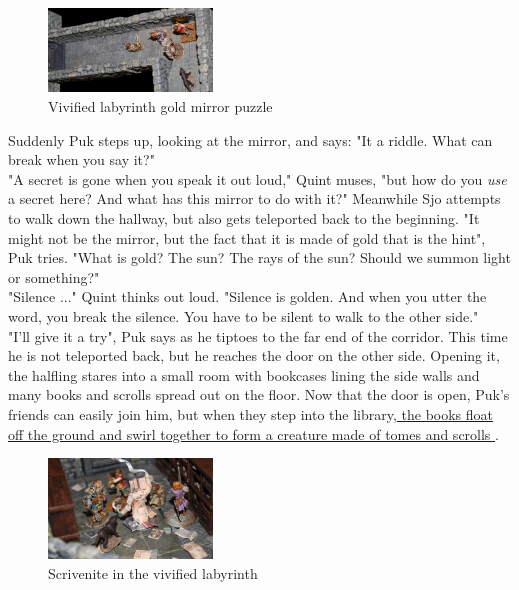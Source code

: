 \begin{figure}[h]
	\centering
	\includegraphics[width=0.39\textwidth]{images/Vivified-labyrinth-gold-mirror-puzzle-563931764.jpg}
	\caption{Vivified labyrinth gold mirror puzzle}
	\label{fig:Vivified-labyrinth-gold-mirror-puzzle-563931764}
\end{figure}

Suddenly Puk steps up, looking at the mirror, and says: "It a riddle. What can break when you say it?"\\

"A secret is gone when you speak it out loud," Quint muses, "but how do you {\itshape use} a secret here? And what has this mirror to do with it?" Meanwhile Sjo attempts to walk down the hallway, but also gets teleported back to the beginning. "It might not be the mirror, but the fact that it is made of gold that is the hint", Puk tries. "What is gold? The sun? The rays of the sun? Should we summon light or something?"\\

"Silence ..." Quint thinks out loud. "Silence is golden. And when you utter the word, you break the silence. You have to be silent to walk to the other side."\\

"I'll give it a try", Puk says as he tiptoes to the far end of the corridor. This time he is not teleported back, but he reaches the door on the other side. Opening it, the halfling stares into a small room with bookcases lining the side walls and many books and scrolls spread out on the floor. Now that the door is open, Puk's friends can easily join him, but when they step into the library,\hyperref[fig:Scrivenite-in-the-vivified-labyrinth-563932189]{ the books float off the ground and swirl together to form a creature made of tomes and scrolls } . \\

\begin{figure}[h]
	\centering
	\includegraphics[width=0.39\textwidth]{images/Scrivenite-in-the-vivified-labyrinth-563932189.jpg}
	\caption{Scrivenite in the vivified labyrinth}
	\label{fig:Scrivenite-in-the-vivified-labyrinth-563932189}
\end{figure}

